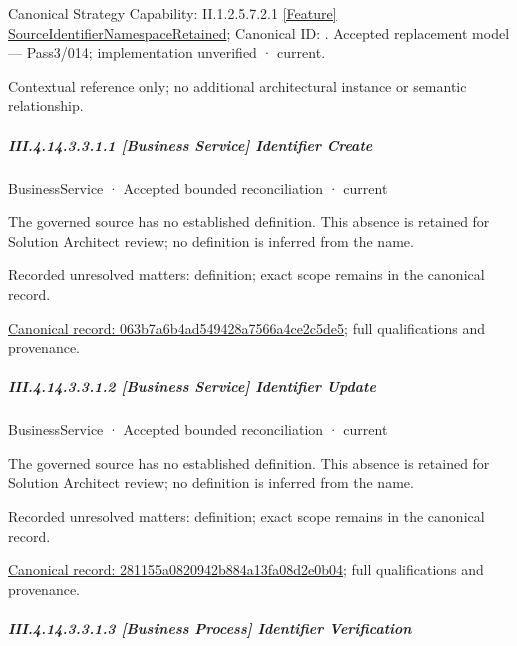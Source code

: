 {\small Canonical Strategy Capability: II.1.2.5.7.2.1 \hyperref[element:6c77e4aa99d6438c93a5df4720758414]{[Feature] SourceIdentifierNamespaceRetained}; Canonical ID: \texttt{}. Accepted replacement model — Pass3/014; implementation unverified · current.}\par
Contextual reference only; no additional architectural instance or semantic relationship.\par
\subparagraph*{III.4.14.3.3.1.1 [Business Service] Identifier Create}
\label{navigation:III.4.14.3.3.1.1}

\label{element:063b7a6b4ad549428a7566a4ce2c5de5}
{\small BusinessService · Accepted bounded reconciliation · current}\par

The governed source has no established definition. This absence is retained for Solution Architect review; no definition is inferred from the name.


{\small Recorded unresolved matters: definition; exact scope remains in the canonical record.}\par
{\footnotesize \href{../../../../../../../../continuum/business/business-service/063b7a6b4ad549428a7566a4ce2c5de5.md}{Canonical record: 063b7a6b4ad549428a7566a4ce2c5de5}; full qualifications and provenance.}\par
\subparagraph*{III.4.14.3.3.1.2 [Business Service] Identifier Update}
\label{navigation:III.4.14.3.3.1.2}

\label{element:281155a0820942b884a13fa08d2e0b04}
{\small BusinessService · Accepted bounded reconciliation · current}\par

The governed source has no established definition. This absence is retained for Solution Architect review; no definition is inferred from the name.


{\small Recorded unresolved matters: definition; exact scope remains in the canonical record.}\par
{\footnotesize \href{../../../../../../../../continuum/business/business-service/281155a0820942b884a13fa08d2e0b04.md}{Canonical record: 281155a0820942b884a13fa08d2e0b04}; full qualifications and provenance.}\par
\subparagraph*{III.4.14.3.3.1.3 [Business Process] Identifier Verification}
\label{navigation:III.4.14.3.3.1.3}

